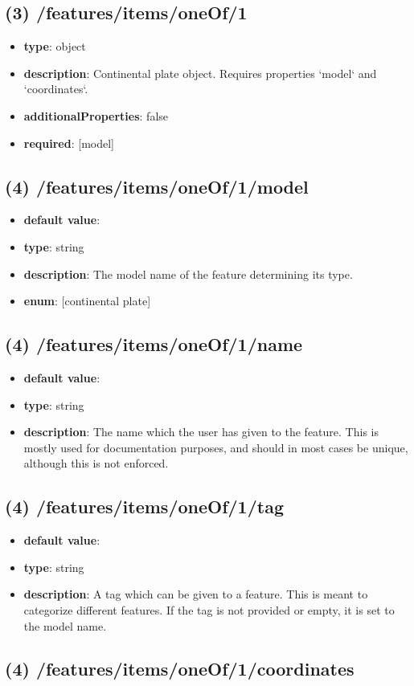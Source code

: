 \subsection{(3) /features/items/oneOf/1}
\begin{itemize}[leftmargin=3em]\item {\bf type}: object
\item {\bf description}: Continental plate object. Requires properties `model` and `coordinates`.
\item {\bf additionalProperties}: false
\item {\bf required}: [model]\end{itemize}
\subsection{(4) /features/items/oneOf/1/model}
\begin{itemize}[leftmargin=4em]\item {\bf default value}: 
\item {\bf type}: string
\item {\bf description}: The model name of the feature determining its type.
\item {\bf enum}: [continental plate]\end{itemize}\subsection{(4) /features/items/oneOf/1/name}
\begin{itemize}[leftmargin=4em]\item {\bf default value}: 
\item {\bf type}: string
\item {\bf description}: The name which the user has given to the feature. This is mostly used for documentation purposes, and should in most cases be unique, although this is not enforced.
\end{itemize}\subsection{(4) /features/items/oneOf/1/tag}
\begin{itemize}[leftmargin=4em]\item {\bf default value}: 
\item {\bf type}: string
\item {\bf description}: A tag which can be given to a feature. This is meant to categorize different features. If the tag is not provided or empty, it is set to the model name.
\end{itemize}\subsection{(4) /features/items/oneOf/1/coordinates}
